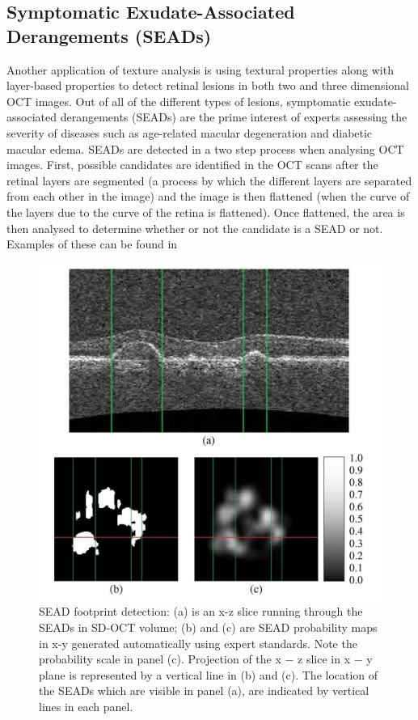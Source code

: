 \subsection{Symptomatic Exudate-Associated Derangements (SEADs)}
Another application of texture analysis is using textural properties along with
layer-based properties to detect retinal lesions in both two and three dimensional
OCT images. Out of all of the different types of lesions, symptomatic exudate-associated derangements (SEADs) are the prime interest of
experts assessing the severity of diseases such as age-related macular degeneration and diabetic macular edema.  SEADs are detected in a two step process when analysing OCT images.  First, possible candidates are identified in the OCT scans after the retinal layers are segmented (a process by which the different layers are separated from each other in the image) and the image is then flattened (when the curve of the layers due to the curve of the retina is flattened).  Once flattened, the area is then analysed to determine whether or not the candidate is a SEAD or not. 
\cite{mbib_4} Examples of these can be found in 

\begin{figure}[htbp]
\centering
\includegraphics{figures/morgan_7}
\caption{SEAD footprint detection: (a) is an x-z slice running through the SEADs in SD-OCT volume; (b) and (c) are SEAD probability maps in x-y generated automatically using expert standards.  Note the probability scale in panel (c). Projection of the x − z slice in x − y plane is represented by a vertical line in (b) and (c). The location of the SEADs which are visible in panel (a), are indicated by vertical lines in each panel. \cite{mbib_4} }
\label{fig:m_7}
\end{figure}

